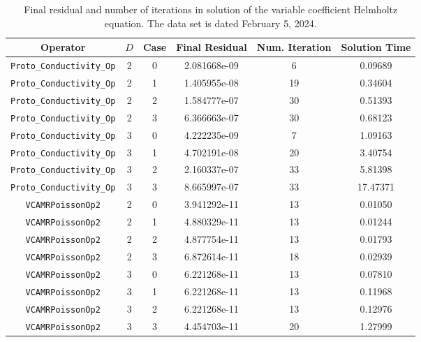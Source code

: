 \documentclass{article}
\begin{document}
\begin{small}
\begin{table}
\begin{center}
\begin{tabular}{|c|c|c|c|c||c|} \hline
 Operator                   & $D$ & Case & Final Residual &
 Num. Iteration & Solution Time\\
\hline
 {\tt Proto\_Conductivity\_Op}    & 2   & 0    & 2.081668e-09   &         6  & 0.09689 \\
 {\tt Proto\_Conductivity\_Op}    & 2   & 1    & 1.405955e-08   &         19 & 0.34604 \\
 {\tt Proto\_Conductivity\_Op}    & 2   & 2    & 1.584777e-07   &         30 & 0.51393 \\
 {\tt Proto\_Conductivity\_Op}    & 2   & 3    & 6.366663e-07   &         30 & 0.68123 \\
 {\tt Proto\_Conductivity\_Op}    & 3   & 0    & 4.222235e-09   &         7  & 1.09163 \\
 {\tt Proto\_Conductivity\_Op}    & 3   & 1    & 4.702191e-08   &         20 & 3.40754 \\
 {\tt Proto\_Conductivity\_Op}    & 3   & 2    & 2.160337e-07   &         33 & 5.81398 \\
 {\tt Proto\_Conductivity\_Op}    & 3   & 3    & 8.665997e-07   &         33 & 17.47371\\
\hline                                                                        
 {\tt VCAMRPoissonOp2}            & 2   & 0    & 3.941292e-11   &         13 & 0.01050\\
 {\tt VCAMRPoissonOp2}            & 2   & 1    & 4.880329e-11   &         13 & 0.01244\\
 {\tt VCAMRPoissonOp2}            & 2   & 2    & 4.877754e-11   &         13 & 0.01793\\
 {\tt VCAMRPoissonOp2}            & 2   & 3    & 6.872614e-11   &         18 & 0.02939\\
 {\tt VCAMRPoissonOp2}            & 3   & 0    & 6.221268e-11   &         13 & 0.07810\\
 {\tt VCAMRPoissonOp2}            & 3   & 1    & 6.221268e-11   &         13 & 0.11968\\
 {\tt VCAMRPoissonOp2}            & 3   & 2    & 6.221268e-11   &         13 & 0.12976\\
 {\tt VCAMRPoissonOp2}            & 3   & 3    & 4.454703e-11   &         20 & 1.27999\\
\hline
\end{tabular}
\end{center}
\label{tab::conductivity}
\caption
    {
      Final residual and number of iterations in solution of the variable
      coefficient Helmholtz equation.
      The data set is dated February 5, 2024.
    }
\end{table}
\end{small}
\end{document}
